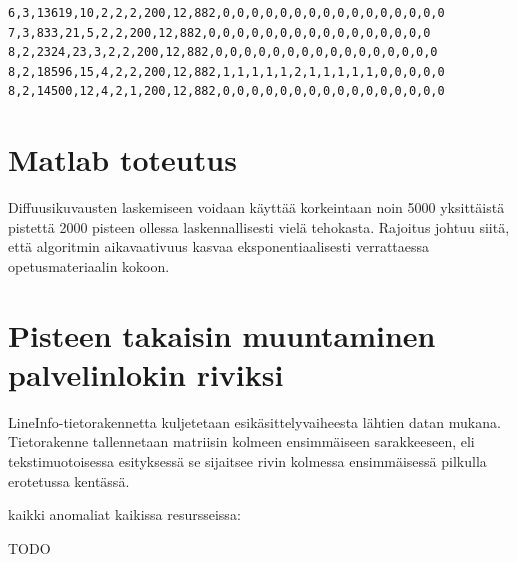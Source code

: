 \begin{lstlisting}[float=h,label=csv882,aboveskip=0.5cm,caption=Esikäsiteltyä
  dataa CSV-muodossa esitettynä.]
6,3,13619,10,2,2,2,200,12,882,0,0,0,0,0,0,0,0,0,0,0,0,0,0,0,0
7,3,833,21,5,2,2,200,12,882,0,0,0,0,0,0,0,0,0,0,0,0,0,0,0,0
8,2,2324,23,3,2,2,200,12,882,0,0,0,0,0,0,0,0,0,0,0,0,0,0,0,0
8,2,18596,15,4,2,2,200,12,882,1,1,1,1,1,2,1,1,1,1,1,0,0,0,0,0
8,2,14500,12,4,2,1,200,12,882,0,0,0,0,0,0,0,0,0,0,0,0,0,0,0,0
\end{lstlisting}

\section{Matlab toteutus}
\label{sec:matlab}

Diffuusikuvausten laskemiseen voidaan käyttää korkeintaan noin 5000 yksittäistä pistettä 2000 pisteen ollessa laskennallisesti vielä tehokasta. Rajoitus johtuu siitä, että
algoritmin aikavaativuus kasvaa eksponentiaalisesti verrattaessa opetusmateriaalin kokoon. 

\section{Pisteen takaisin muuntaminen palvelinlokin riviksi}

LineInfo-tietorakennetta kuljetetaan esikäsittelyvaiheesta
lähtien datan mukana. Tietorakenne tallennetaan matriisin kolmeen
ensimmäiseen sarakkeeseen, eli tekstimuotoisessa esityksessä se
sijaitsee rivin kolmessa ensimmäisessä pilkulla erotetussa kentässä.


kaikki anomaliat kaikissa resursseissa:




TODO
